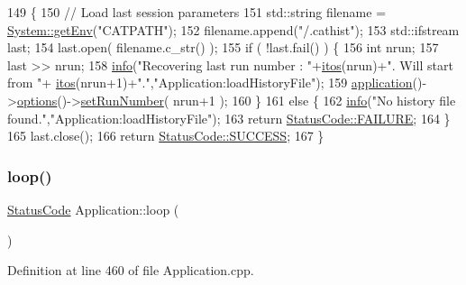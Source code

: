 \begin{DoxyCode}
149                                        \{
150   \textcolor{comment}{// Load last session parameters}
151   std::string filename = \hyperlink{namespaceSystem_af83af19ba6c1083e5643390dfd65f7aa}{System::getEnv}(\textcolor{stringliteral}{"CATPATH"});
152   filename.append(\textcolor{stringliteral}{"/.cathist"});
153   std::ifstream last;
154   last.open( filename.c\_str() );
155   \textcolor{keywordflow}{if} ( !last.fail() ) \{
156     \textcolor{keywordtype}{int} nrun;
157     last >> nrun;
158     \hyperlink{classObject_a644fd329ea4cb85f54fa6846484b84a8}{info}(\textcolor{stringliteral}{"Recovering last run number : "}+\hyperlink{Tools_8h_af330027dbdafb9a30768b3613c553e60}{itos}(nrun)+\textcolor{stringliteral}{". Will start from "}+
      \hyperlink{Tools_8h_af330027dbdafb9a30768b3613c553e60}{itos}(nrun+1)+\textcolor{stringliteral}{"."},\textcolor{stringliteral}{"Application:loadHistoryFile"});
159     \hyperlink{Tools_8h_a27885a3c35afe79029fb830f32f66458}{application}()->\hyperlink{classApplication_ada7cc0e8db586985f1435aee0c79f47d}{options}()->\hyperlink{classOptions_aed19a55eb2c418f333bc97615cf4a3a8}{setRunNumber}( nrun+1 );
160   \}
161   \textcolor{keywordflow}{else} \{
162     \hyperlink{classObject_a644fd329ea4cb85f54fa6846484b84a8}{info}(\textcolor{stringliteral}{"No history file found."},\textcolor{stringliteral}{"Application:loadHistoryFile"});
163     \textcolor{keywordflow}{return} \hyperlink{classStatusCode_a6f565cbeadc76d14c72f047e5e85eb4ba3da73d4c469762eb9d3c960368252b26}{StatusCode::FAILURE};
164   \}
165   last.close();
166   \textcolor{keywordflow}{return} \hyperlink{classStatusCode_a6f565cbeadc76d14c72f047e5e85eb4badd0da38d3ba0d922efd1f4619bc37ad8}{StatusCode::SUCCESS};
167 \}
\end{DoxyCode}
\mbox{\label{classApplication_ab38055646202ef49c9ee2eda6d48076f}} 
\subsubsection{\texorpdfstring{loop()}{loop()}}
{\footnotesize\ttfamily \hyperlink{classStatusCode}{Status\+Code} Application\+::loop (\begin{DoxyParamCaption}{ }\end{DoxyParamCaption})}



Definition at line 460 of file Application.\+cpp.



